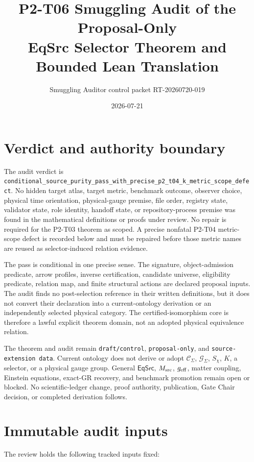 \documentclass[11pt]{article}
\title{P2-T06 Smuggling Audit of the Proposal-Only\\
EqSrc Selector Theorem and Bounded Lean Translation}
\author{Smuggling Auditor control packet RT-20260720-019}
\date{2026-07-21}
\newcommand{\G}{\mathcal G_{\Sigma}}
\newcommand{\C}{\mathcal C_{\Sigma}}
\newcommand{\Sch}{S_{\chi}}
\begin{document}
\maketitle

\section{Verdict and authority boundary}

The audit verdict is
\texttt{conditional\_source\_purity\_pass\_with\_precise\_p2\_t04\_k\_metric\_scope\_defect}.
No hidden target atlas, target metric, benchmark outcome, observer choice,
physical time orientation, physical-gauge premise, file order, registry state,
validator state, role identity, handoff state, or repository-process premise
was found in the mathematical definitions or proofs under review.  No repair
is required for the P2-T03 theorem as scoped.  A precise nonfatal P2-T04
metric-scope defect is recorded below and must be repaired before those metric
names are reused as selector-induced relation evidence.

The pass is conditional in one precise sense.  The signature, object-admission
predicate, arrow profiles, inverse certification, candidate universe,
eligibility predicate, relation map, and finite structural actions are
declared proposal inputs.  The audit finds no post-selection reference in
their written definitions, but it does not convert their declaration into a
current-ontology derivation or an independently selected physical category.
The certified-isomorphism core is therefore a lawful explicit theorem domain,
not an adopted physical equivalence relation.

The theorem and audit remain \texttt{draft/control}, \texttt{proposal-only},
and \texttt{source-extension data}.  Current ontology does not derive or adopt
\(\C\), \(\G\), \(\Sch\), \(K\), a selector, or a physical gauge group.
General \(\mathsf{EqSrc}\), \(M_{\rm src}\), \(g_{\rm eff}\), matter
coupling, Einstein equations, exact-GR recovery, and benchmark promotion remain
open or blocked.  No scientific-ledger change, proof authority, publication,
Gate Chair decision, or completed derivation follows.

\section{Immutable audit inputs}

The review holds the following tracked inputs fixed:
\end{document}
